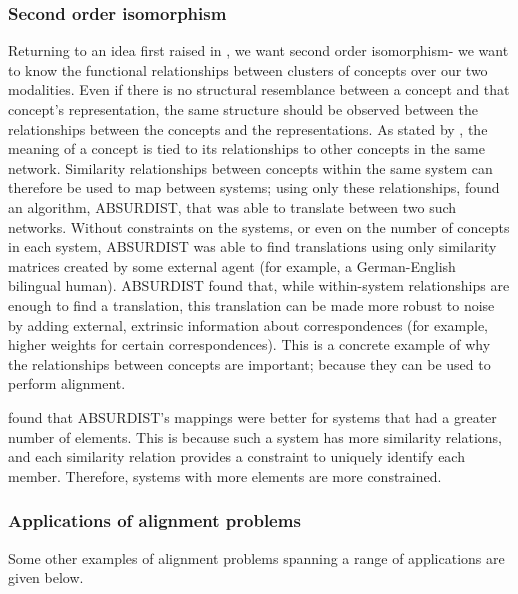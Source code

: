 \subsubsection{Second order isomorphism}

Returning to an idea first raised in \cite{SHEPARD19701}, we want second order isomorphism- we want to know the functional relationships between clusters of concepts over our two modalities. Even if there is no structural resemblance between a concept and that concept's representation, the same structure should be observed between the relationships between the concepts  and the representations. As stated by \cite{GOLDSTONE2002295}, the meaning of a concept is tied to its relationships to other concepts in the same network. Similarity relationships between concepts within the same system can therefore be used to map between systems; using only these relationships, \cite{GOLDSTONE2002295} found an algorithm, ABSURDIST, that was able to translate between two such networks. Without constraints on the systems, or even on the number of concepts in each system, ABSURDIST was able to find translations using only similarity matrices created by some external agent (for example, a German-English bilingual human). ABSURDIST found that, while within-system relationships are enough to find a translation, this translation can be made more robust to noise by adding external, extrinsic information about correspondences (for example, higher weights for certain correspondences). This is a concrete example of why the relationships between concepts are important; because they can be used to perform alignment. 

\cite{GOLDSTONE2002295} found that ABSURDIST's mappings were better for systems that had a greater number of elements. This is because such a system has more similarity relations, and each similarity relation provides a constraint to uniquely identify each member. Therefore, systems with more elements are more constrained. 

\subsubsection{Applications of alignment problems}

Some other examples of alignment problems spanning a range of applications are given below.  

